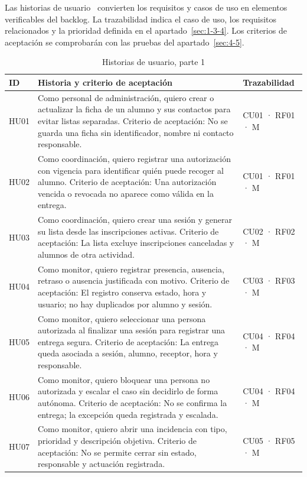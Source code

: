 Las historias de usuario~\cite{ref38} convierten los requisitos y casos de uso en elementos verificables del backlog. La trazabilidad indica el caso de uso, los requisitos relacionados y la prioridad definida en el apartado~\ref{sec:1-3-4}. Los criterios de aceptación se comprobarán con las pruebas del apartado~\ref{sec:4-5}.

\begin{table}[H]
\centering\small
\begin{tabularx}{\textwidth}{>{\hsize=0.200\hsize\raggedright\arraybackslash}X>{\hsize=2.194\hsize\raggedright\arraybackslash}X>{\hsize=0.606\hsize\raggedright\arraybackslash}X}
\toprule
\rowcolor{cabeceratabla} \textbf{ID} & \textbf{Historia y criterio de aceptación} & \textbf{Trazabilidad} \\
\midrule
HU01 & Como personal de administración, quiero crear o actualizar la ficha de un alumno y sus contactos para evitar listas separadas. \newline Criterio de aceptación: No se guarda una ficha sin identificador, nombre ni contacto responsable. & CU01 · RF01 · M \\
HU02 & Como coordinación, quiero registrar una autorización con vigencia para identificar quién puede recoger al alumno. \newline Criterio de aceptación: Una autorización vencida o revocada no aparece como válida en la entrega. & CU01 · RF01 · M \\
HU03 & Como coordinación, quiero crear una sesión y generar su lista desde las inscripciones activas. \newline Criterio de aceptación: La lista excluye inscripciones canceladas y alumnos de otra actividad. & CU02 · RF02 · M \\
HU04 & Como monitor, quiero registrar presencia, ausencia, retraso o ausencia justificada con motivo. \newline Criterio de aceptación: El registro conserva estado, hora y usuario; no hay duplicados por alumno y sesión. & CU03 · RF03 · M \\
HU05 & Como monitor, quiero seleccionar una persona autorizada al finalizar una sesión para registrar una entrega segura. \newline Criterio de aceptación: La entrega queda asociada a sesión, alumno, receptor, hora y responsable. & CU04 · RF04 · M \\
HU06 & Como monitor, quiero bloquear una persona no autorizada y escalar el caso sin decidirlo de forma autónoma. \newline Criterio de aceptación: No se confirma la entrega; la excepción queda registrada y escalada. & CU04 · RF04 · M \\
HU07 & Como monitor, quiero abrir una incidencia con tipo, prioridad y descripción objetiva. \newline Criterio de aceptación: No se permite cerrar sin estado, responsable y actuación registrada. & CU05 · RF05 · M \\
\bottomrule
\end{tabularx}
\caption{Historias de usuario, parte 1}\label{tab:37}
\end{table}

